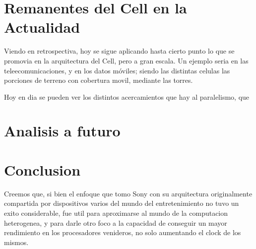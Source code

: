 \documentclass[10pt,compsoc]{IEEEtran}
\begin{document}
	
	\section{Remanentes del Cell en la Actualidad}%
	\noindent Viendo en retrospectiva, hoy se sigue aplicando hasta cierto punto lo que se promovia en la arquitectura del Cell, pero a gran escala. 
	Un ejemplo seria en las teleecomunicaciones, y en los datos móviles; siendo las distintas celulas las porciones de terreno con cobertura movil, mediante las torres.
	
	Hoy en dia se pueden ver los distintos acercamientos que hay al paralelismo, que 
	
	
	\section{Analisis a futuro}
	\noindent 
	
	
	\section{Conclusion}
	\noindent Creemos que, si bien el enfoque que tomo Sony con su arquitectura originalmente compartida por dispositivos varios del mundo del entretenimiento no tuvo un exito considerable, fue util para aproximarse al mundo de la computacion heterogenea, y para darle otro foco a la capacidad de conseguir un mayor rendimiento en los procesadores venideros, no solo aumentando el clock de los mismos.
	
\end{document}
